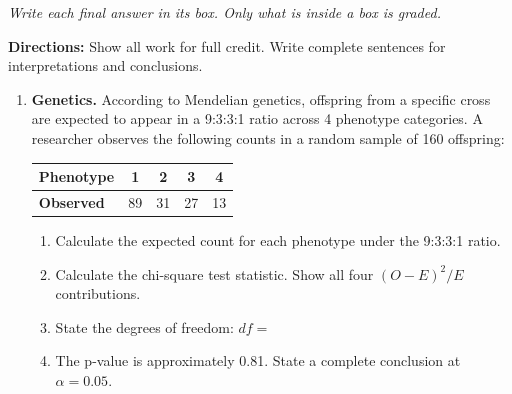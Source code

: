 \documentclass[10pt]{article}
\begin{document}
{\small\itshape Write each final answer in its box. Only what is inside a box is graded.}\par

\vspace{0.1in}
\textbf{Directions:} Show all work for full credit. Write complete sentences for
interpretations and conclusions.

\begin{enumerate}

  \item \textbf{Genetics.} According to Mendelian genetics, offspring from a specific
        cross are expected to appear in a 9:3:3:1 ratio across 4 phenotype categories.
        A researcher observes the following counts in a random sample of 160 offspring:

        \renewcommand{\arraystretch}{1.4}
        \begin{center}
        \begin{tabular}{lcccc}
            \textbf{Phenotype} & 1  & 2  & 3  & 4  \\
            \hline
            \textbf{Observed}  & 89 & 31 & 27 & 13 \\
        \end{tabular}
        \end{center}

        \begin{enumerate}[label=\alph*.]
          \item Calculate the expected count for each phenotype under the 9:3:3:1 ratio.
          \item Calculate the chi-square test statistic. Show all four
                $(O - E)^2 / E$ contributions.
          \item State the degrees of freedom: $df =$\hfill{}
          \item The p-value is approximately 0.81. State a complete conclusion at
                $\alpha = 0.05$.
        \end{enumerate}


\end{enumerate}
\end{document}
